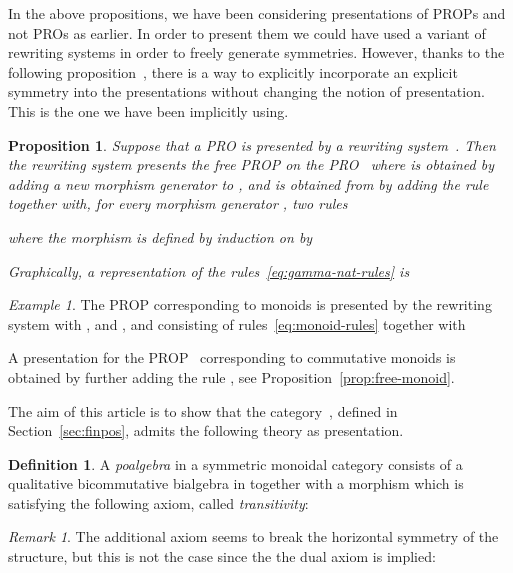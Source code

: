 \documentclass[submission,copyright,creativecommons]{eptcs}
\newtheorem{proposition}[theorem]{Proposition}
\theoremstyle{definition}
\newtheorem{definition}[theorem]{Definition}
\theoremstyle{remark}
\newtheorem{example}[theorem]{Example}
\newtheorem{remark}[theorem]{Remark}
\begin{document}
In the above propositions, we have been considering presentations of PROPs and
not PROs as earlier. In order to present them we could have used a variant of
rewriting systems in order to freely generate symmetries. However, thanks to the
following proposition~\cite{burroni1993higher}, there is a way to explicitly
incorporate an explicit symmetry into the presentations without changing the
notion of presentation. This is the one we have been implicitly using.

\begin{proposition}
  Suppose that a PRO  is presented by a rewriting system~. Then
  the rewriting system  presents the free PROP on the PRO~
  where  is obtained by adding a new morphism generator 
  to , and  is obtained from  by adding the rule
   together with, for every morphism generator
  , two rules
  
  where the morphism  is defined by induction on
   by
  
  Graphically, a representation of the rules~\eqref{eq:gamma-nat-rules} is
  
\end{proposition}

\begin{example}
  The PROP corresponding to monoids is presented by the rewriting system
   with , and , and  consisting of rules~\eqref{eq:monoid-rules}
  together with
  
  A presentation for the PROP~ corresponding to commutative
  monoids is obtained by further adding the rule , see
  Proposition~\ref{prop:free-monoid}.
\end{example}

The aim of this article is to show that the category~, defined in
Section~\ref{sec:finpos}, admits the following theory as presentation.

\begin{definition}
  A \emph{poalgebra}  in a symmetric
  monoidal category  consists of a qualitative bicommutative bialgebra
   in  together with a morphism
   which is satisfying the following axiom, called
  \emph{transitivity}:
  
\end{definition}

\begin{remark}
  The additional axiom seems to break the horizontal symmetry of the structure,
  but this is not the case since the the dual axiom is implied:
  
\end{remark}
\end{document}
